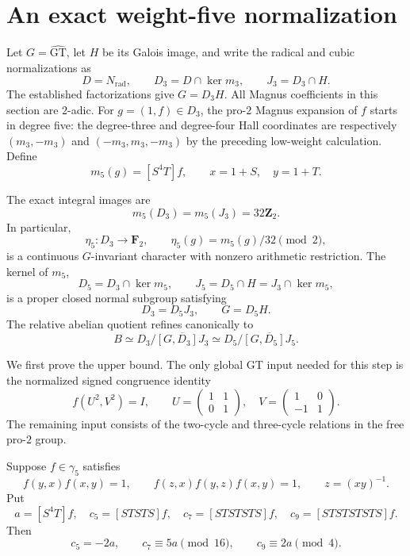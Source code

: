
\section{An exact weight-five normalization}
\label{sec:weight-five-normalization}

Let $G=\widehat{\mathrm{GT}}$, let $H$ be its Galois image, and write
the radical and cubic normalizations as
\[
 D=N_{\mathrm{rad}},\qquad
 D_3=D\cap\ker m_3,\qquad J_3=D_3\cap H.
\]
The established factorizations give $G=D_3H$.  All Magnus coefficients
in this section are $2$-adic.  For $g=(1,f)\in D_3$, the pro-$2$
Magnus expansion of $f$ starts in degree five: the degree-three and
degree-four Hall coordinates are respectively
$(m_3,-m_3)$ and $(-m_3,m_3,-m_3)$ by the preceding low-weight
calculation.  Define
\[
 m_5(g)=[S^4T]f,\qquad x=1+S,\quad y=1+T.
\]

\begin{theorem}\label{thm:weight-five-exact-image}
The exact integral images are
\[
 m_5(D_3)=m_5(J_3)=32\mathbf Z_2.
\]
In particular,
\[
 \eta_5:D_3\longrightarrow\mathbf F_2,
 \qquad \eta_5(g)=m_5(g)/32\pmod2,
\]
is a continuous $G$-invariant character with nonzero arithmetic
restriction.  The kernel of $m_5$,
\[
 D_5=D_3\cap\ker m_5,
 \qquad J_5=D_5\cap H=J_3\cap\ker m_5,
\]
is a proper closed normal subgroup satisfying
\[
 D_3=D_5J_3,\qquad G=D_5H.
\]
The relative abelian quotient refines canonically to
\[
 B\simeq D_3/\overline{[G,D_3]J_3}
       \simeq D_5/\overline{[G,D_5]J_5}.
\]
\end{theorem}

We first prove the upper bound.  The only global GT input needed
for this step is the normalized signed congruence identity
\begin{equation}\label{eq:weight-five-signed-input}
 f(U^2,V^2)=I,
 \qquad
 U=\begin{pmatrix}1&1\\0&1\end{pmatrix},\quad
 V=\begin{pmatrix}1&0\\-1&1\end{pmatrix}.
\end{equation}
The remaining input consists of the two-cycle and three-cycle
relations in the free pro-$2$ group.

\begin{lemma}
\label{lem:weight-five-coefficients}
Suppose $f\in\gamma_5$ satisfies
\[
 f(y,x)f(x,y)=1,\qquad
 f(z,x)f(y,z)f(x,y)=1,\qquad z=(xy)^{-1}.
\]
Put
\[
 a=[S^4T]f,\quad
 c_5=[STSTS]f,\quad
 c_7=[STSTSTS]f,\quad
 c_9=[STSTSTSTS]f.
\]
Then
\begin{equation}\label{eq:weight-five-three-coefficients}
 c_5=-2a,\qquad c_7\equiv5a\pmod{16},\qquad
 c_9\equiv2a\pmod4.
\end{equation}
\end{lemma}

